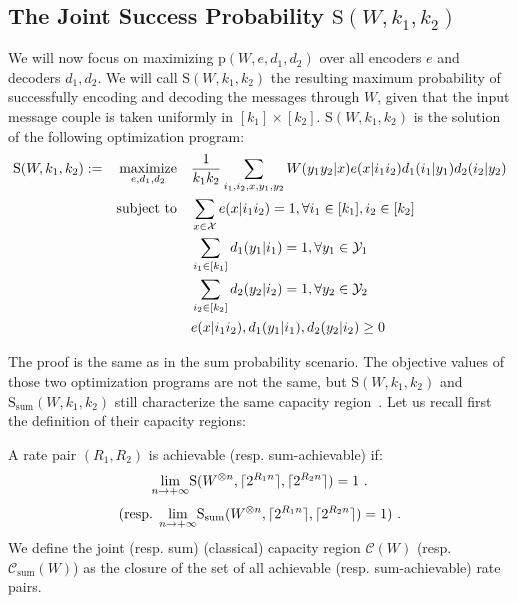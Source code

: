 \subsection{The Joint Success Probability $\mathrm{S}(W,k_1,k_2)$}
We will now focus on maximizing $\mathrm{p}(W,e,d_1,d_2)$ over all encoders $e$ and decoders $d_1,d_2$. We will call $\mathrm{S}(W,k_1,k_2)$ the resulting maximum probability of successfully encoding and decoding the messages through $W$, given that the input message couple is taken uniformly in $[k_1] \times [k_2]$. $\mathrm{S}(W,k_1,k_2)$ is the solution of the following optimization program:
\begin{equation}
  \begin{aligned}
    \mathrm{S}(W,k_1,k_2) := &&\underset{e,d_1,d_2}{\operatorname{\text{maximize}}} &&& \frac{1}{k_1k_2}\sum_{i_1,i_2,x,y_1,y_2} W(y_1y_2|x)e(x|i_1i_2)d_1(i_1|y_1)d_2(i_2|y_2)\\
    &&\operatorname{\text{subject to}} &&& \sum_{x \in \mathcal{X}} e(x|i_1i_2) = 1, \forall i_1 \in [k_1], i_2 \in [k_2]\\
    &&&&& \sum_{i_1 \in [k_1]} d_1(y_1|i_1) = 1, \forall y_1 \in \mathcal{Y}_1\\
    &&&&& \sum_{i_2 \in [k_2]} d_2(y_2|i_2) = 1, \forall y_2 \in \mathcal{Y}_2\\
    &&&&& e(x|i_1i_2), d_1(y_1|i_1), d_2(y_2|i_2) \geq 0
  \end{aligned}
\end{equation}

The proof is the same as in the sum probability scenario. The objective values of those two optimization programs are not the same, but $\mathrm{S}(W,k_1,k_2)$ and $\mathrm{S}_{\text{sum}}(W,k_1,k_2)$ still characterize the same capacity region~\cite{Willems90}. Let us recall first the definition of their capacity regions:

\begin{definition}
  A rate pair $(R_1,R_2)$ is achievable (resp. sum-achievable) if:
  \[ \underset{n \rightarrow +\infty}{\lim} \mathrm{S}(W^{\otimes n},\ceil{2^{R_1n}},\ceil{2^{R_2n}}) = 1 \ . \]
  \[ \text{(resp. }\underset{n \rightarrow +\infty}{\lim} \mathrm{S}_{\text{sum}}(W^{\otimes n},\lceil2^{R_1n}\rceil,\lceil2^{R_2n}\rceil) = 1 )\ . \]
  We define the joint (resp. sum) (classical) capacity region $\mathcal{C}(W)$ (resp. $\mathcal{C}_{\text{sum}}(W)$) as the closure of the set of all achievable (resp. sum-achievable) rate pairs.
\end{definition}

